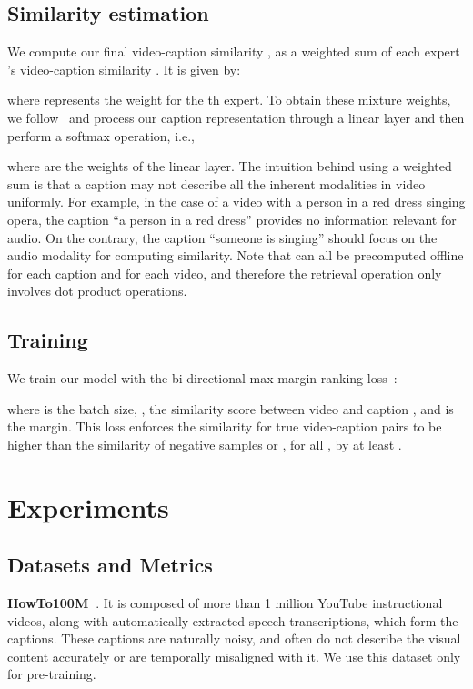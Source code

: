 \documentclass[runningheads]{llncs}
\begin{document}
\subsection{Similarity estimation}
\label{section:similarity_estimation}
We compute our final video-caption similarity , as a weighted sum of each expert 's video-caption similarity . It is given by:

where  represents the weight for the th expert. To obtain these mixture weights, we follow~\cite{miech2018learning} and process our caption representation  through a linear layer and then perform a softmax operation, i.e.,

where  are the weights of the linear layer. The intuition behind using a weighted sum is that a caption may not describe all the inherent modalities in video uniformly. For example, in the case of a video with a person in a red dress singing opera, the caption ``a person in a red dress'' provides no information relevant for audio. On the contrary, the caption ``someone is singing'' should focus on the audio modality for computing similarity. Note that  can all be precomputed offline for each caption and for each video, and therefore the retrieval operation only involves dot product operations.

\subsection{Training}
We train our model with the bi-directional max-margin ranking loss~\cite{Karpathy2014DeepFE}:

where  is the batch size, , the similarity score between video  and caption , and  is the margin. This loss enforces the similarity for true video-caption pairs  to be higher than the similarity of negative samples  or , for all , by at least .
 
\section{Experiments}
\label{section:experiments}

\subsection{Datasets and Metrics}
\noindent\textbf{HowTo100M~\cite{miech19howto100m}}. It is composed of more than 1 million YouTube instructional videos, along with automatically-extracted speech transcriptions, which form the captions. These captions are naturally noisy, and often do not describe the visual content accurately or are temporally misaligned with it. We use this dataset only for pre-training.
\end{document}
